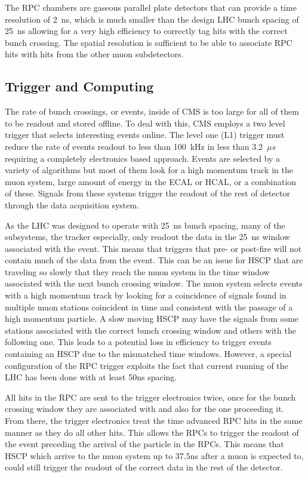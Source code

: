 The RPC chambers are gaseous parallel plate detectors that can provide a time resolution of 2~ns, which is much smaller than the design LHC bunch spacing of 25~ns allowing for
a very high efficiency to correctly tag hits with the correct bunch crossing. The spatial resolution is sufficient to be able to associate RPC hits with hits
from the other muon subdetectors.

\subsection{Trigger and Computing \label{sec:computing}}
The rate of bunch crossings, or events, inside of CMS is too large for all of them to be readout and stored offline. To deal with this, CMS employs a two level trigger
that selects interesting events online. 
The level one (L1) trigger must reduce the rate of events readout to less than 100~kHz in less than 3.2~$\mu s$
requiring a completely electronics based approach. 
Events are selected by a variety of algorithms but most of them look for a high momentum track in the muon
system, large amount of energy in the ECAL or HCAL, or a combination of these. Signals from these systems trigger the readout of the rest of detector through
the data acquisition system. 

As the LHC was designed to operate with 25~ns bunch spacing, many of the subsystems, the tracker especially, only readout
the data in the 25~ns window associated with the event. This means that triggers that pre- or post-fire will not contain much of the data from the event.
This can be an issue for HSCP that are traveling so slowly that they reach the muon system in the time window associated with the next bunch crossing window.
The muon system selects events with a high momentum track by looking for a coincidence of signals found in multiple muon stations coincident in time and consistent
with the passage of a high momentum particle.
A slow moving HSCP may have the signals from some stations associated with the correct bunch crossing window and others with the following one.
This leads to a potential loss in efficiency to trigger events containing an HSCP due to the mismatched time windows.
However, a special configuration of the RPC trigger exploits the fact that current running of the LHC has been done with at least 50ns spacing.

All hits in the RPC are sent to the trigger electronics twice, once for the bunch crossing window they are associated with and also for the one proceeding it.
From there, the trigger electronics treat the time advanced RPC hits in the same manner as they do all other hits. 
This allows the RPCs to trigger the readout of the event preceding the arrival of the particle in the RPCs.
This means that HSCP which arrive to the muon system up to 37.5ns after
a muon is expected to, could still trigger the readout of the correct data in the rest of the detector.

